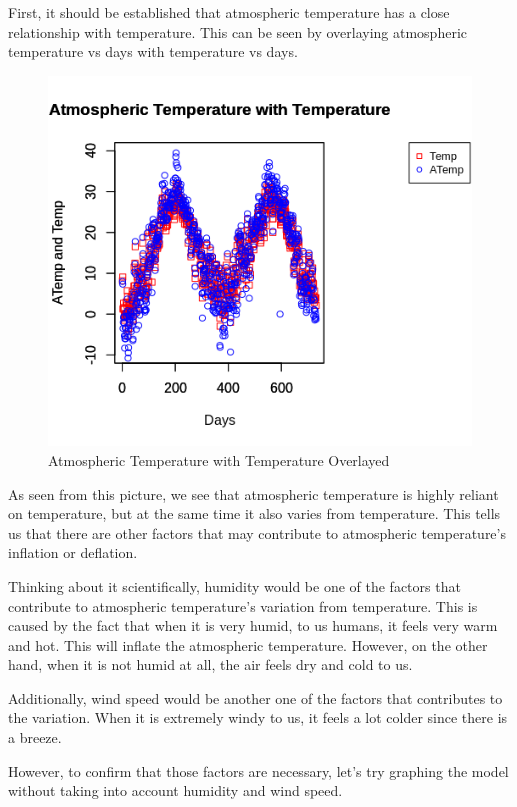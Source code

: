 \documentclass[12pt]{article}
\begin{document}
First, it should be established that atmospheric temperature has a close relationship with temperature. This can be seen by overlaying atmospheric temperature vs days with temperature vs days.
\begin{figure}[H]
	\centering
  	\includegraphics[width=150mm]{atempvstemp.png}
 	\caption{Atmospheric Temperature with Temperature Overlayed}
 	\label{fig:atempandtemp}
\end{figure}
As seen from this picture, we see that atmospheric temperature is highly reliant on temperature, but at the same time it also varies from temperature. This tells us that there are other factors that may contribute to atmospheric temperature's inflation or deflation.

Thinking about it scientifically, humidity would be one of the factors that contribute to atmospheric temperature's variation from temperature. This is caused by the fact that when it is very humid, to us humans, it feels very warm and hot. This will inflate the atmospheric temperature. However, on the other hand, when it is not humid at all, the air feels dry and cold to us.

Additionally, wind speed would be another one of the factors that contributes to the variation. When it is extremely windy to us, it feels a lot colder since there is a breeze.

However, to confirm that those factors are necessary, let's try graphing the model without taking into account humidity and wind speed.
\end{document}
